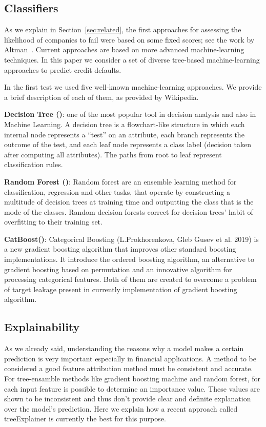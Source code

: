 \subsection{Classifiers}
\label{subsec:algorithms}

As we explain in Section~\ref{sec:related}, the first approaches for
assessing the likelihood of companies to fail were based on some fixed
scores; see the work by Altman~\cite{Altman-8}. Current approaches are
based on more advanced machine-learning techniques. In this paper we consider a set
of diverse tree-based machine-learning approaches to predict credit defaults.

In the first test we used five well-known machine-learning approaches.
We provide a brief description of each of them, as provided by
Wikipedia.

\textbf{Decision Tree (\DT)}: one of the most popular tool in decision
analysis and also in Machine Learning. A decision tree is a
flowchart-like structure in which each internal node represents a
``test'' on an attribute, each branch represents the outcome of the test, and
each leaf node represents a class label (decision taken after computing
all attributes). The paths from root to leaf represent
classification rules.

\textbf{Random Forest (\RF)}: Random forest are an ensemble learning
method for classification, regression and other tasks, that operate by
constructing a multitude of decision trees at training time and
outputting the class that is the mode of the classes. Random decision
forests correct for decision trees' habit of overfitting to their
training set.

\textbf{CatBoost(\CAT)}: Categorical Boosting (L.Prokhorenkova, Gleb Gusev et al. 2019)\cite{catboost} is a new gradient boosting algorithm that improves other standard boosting implementations. It introduce the ordered boosting algorithm, an alternative to gradient boosting based on permutation and an innovative algorithm for processing categorical features. Both of them are created to overcome a problem of target leakage present in currently implementation of gradient boosting algorithm.
\subsection{Explainability}
As we already said, understanding the reasons why a model makes a certain prediction is very important especially in financial applications. A method to be considered a good feature attribution method must be consistent and accurate.
For tree-ensamble methods like gradient boosting machine and random forest, for each input feature is possible to determine an importance value. These values are shown to be inconsistent and thus don't provide clear and definite explanation over the model's prediction.
Here we explain how a recent approach called treeExplainer is currently the best for this purpose.

